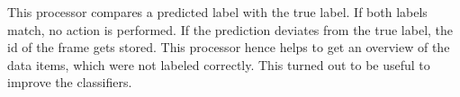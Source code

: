 This processor compares a predicted label with the true label. If both labels match, no action is performed. If the prediction deviates from the true label, the id of the frame gets stored. This processor hence helps to get an overview of the data items, which were not labeled correctly. This turned out to be useful to improve the classifiers.